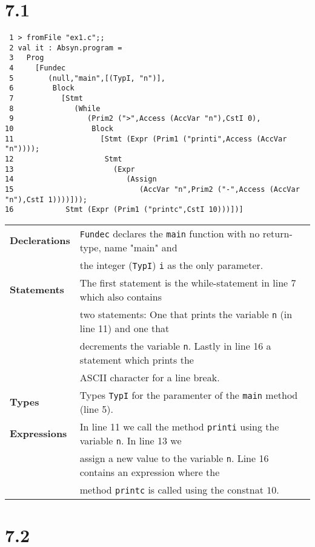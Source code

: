 \documentclass[a4paper]{article}
\begin{document}
\section*{7.1}
\begin{verbatim}
 1 > fromFile "ex1.c";;
 2 val it : Absyn.program =
 3   Prog
 4     [Fundec
 5        (null,"main",[(TypI, "n")],
 6         Block
 7           [Stmt
 8              (While
 9                 (Prim2 (">",Access (AccVar "n"),CstI 0),
10                  Block
11                    [Stmt (Expr (Prim1 ("printi",Access (AccVar "n"))));
12                     Stmt
13                       (Expr
14                          (Assign
15                             (AccVar "n",Prim2 ("-",Access (AccVar "n"),CstI 1))))]));
16            Stmt (Expr (Prim1 ("printc",CstI 10)))])]
\end{verbatim}

\quad

\begin{tabular}{l l}
  \textbf{Declerations} & \texttt{Fundec} declares the \texttt{main} function with no return-type, name "main" and \\
                        & the integer (\texttt{TypI}) \texttt{i} as the only parameter. \\
  \textbf{Statements} & The first statement is the while-statement in line 7 which also contains \\
                      & two statements: One that prints the variable \texttt{n} (in line 11) and one that \\
                      & decrements the variable \texttt{n}. Lastly in line 16 a statement which prints the \\
                      & ASCII character for a line break. \\
  \textbf{Types} & Types \texttt{TypI} for the paramenter of the \texttt{main} method (line 5). \\
  \textbf{Expressions} & In line 11 we call the method \texttt{printi} using the variable \texttt{n}. In line 13 we \\
                       & assign a new value to the variable \texttt{n}. Line 16 contains an expression where the \\
                       & method \texttt{printc} is called using the constnat $10$.
\end{tabular}

\section*{7.2}
\end{document}

